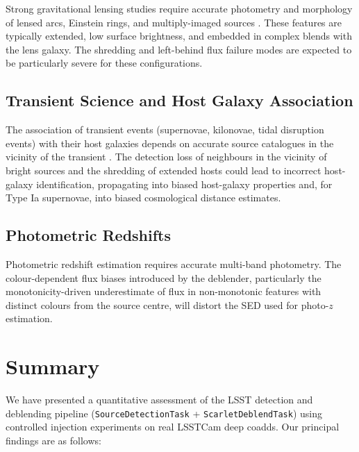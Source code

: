 \documentclass[DM,lsstdraft,authoryear,toc]{lsstdoc}
\newcommand{\task}[1]{\texttt{#1}\xspace}
\begin{document}
Strong gravitational lensing studies require accurate photometry and
morphology of lensed arcs, Einstein rings, and multiply-imaged sources
\citep[e.g.][]{Suyu2017}. These features are typically extended, low surface
brightness, and embedded in complex blends with the lens galaxy. The shredding
and left-behind flux failure modes are expected to be particularly severe for
these configurations.

\subsection{Transient Science and Host Galaxy Association}
\label{sec:implications_transients}

The association of transient events (supernovae, kilonovae, tidal disruption
events) with their host galaxies depends on accurate source catalogues in the
vicinity of the transient \citep[e.g.][]{Gupta2016,Foley2013,Sako2018}. The
detection loss of neighbours in the vicinity of bright sources and the
shredding of extended hosts could lead to incorrect host-galaxy
identification, propagating into biased host-galaxy properties and, for Type
Ia supernovae, into biased cosmological distance estimates.

\subsection{Photometric Redshifts}
\label{sec:implications_photoz}

Photometric redshift estimation \citep[e.g.][]{Benitez2000} requires accurate
multi-band photometry. The colour-dependent flux biases introduced by the
deblender, particularly the monotonicity-driven underestimate of flux in
non-monotonic features with distinct colours from the source centre, will
distort the SED used for photo-$z$ estimation.


\section{Summary}
\label{sec:summary}

We have presented a quantitative assessment of the LSST detection and
deblending pipeline (\task{SourceDetectionTask} + \task{ScarletDeblendTask})
using controlled injection experiments on real LSSTCam deep coadds. Our
principal findings are as follows:
\end{document}
